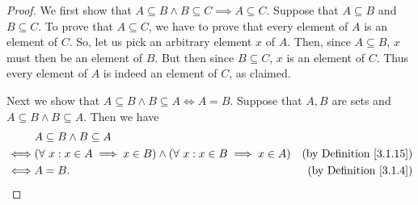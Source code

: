 \begin{proof}
We first show that \(A \subseteq B \land B \subseteq C \implies A \subseteq C\).
Suppose that \(A \subseteq B\) and \(B \subseteq C\).
To prove that \(A \subseteq C\), we have to prove that every element of \(A\) is an element of \(C\).
So, let us pick an arbitrary element \(x\) of \(A\).
Then, since \(A \subseteq B\), \(x\) must then be an element of \(B\).
But then since \(B \subseteq C\), \(x\) is an element of \(C\).
Thus every element of \(A\) is indeed an element of \(C\), as claimed.

Next we show that \(A \subseteq B \land B \subseteq A \iff A = B\).
Suppose that \(A, B\) are sets and \(A \subseteq B \land B \subseteq A\).
Then we have
\begin{align*}
& A \subseteq B \land B \subseteq A \\
\iff & (\forall\ x : x \in A \implies x \in B) \land (\forall\ x : x \in B \implies x \in A) & \text{(by Definition \ref{3.1.15})} \\
\iff & A = B. & \text{(by Definition \ref{3.1.4})}
\end{align*}


\end{proof}
